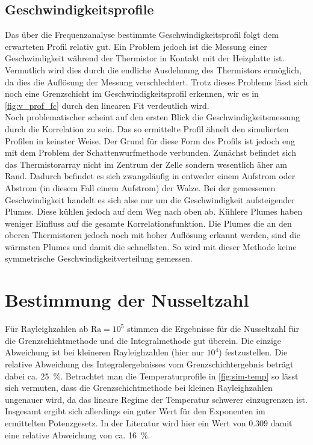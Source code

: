 \subsection{Geschwindigkeitsprofile}
Das über die Frequenzanalyse bestimmte Geschwindigkeitsprofil folgt dem erwarteten Profil relativ gut. Ein Problem jedoch ist die Messung einer Geschwindigkeit während der Thermistor in Kontakt mit der Heizplatte ist. Vermutlich wird dies durch die endliche Ausdehnung des Thermistors ermöglich, da dies die Auflösung der Messung verschlechtert.
Trotz dieses Problems lässt sich noch eine Grenzschicht im Geschwindigkeitsprofil erkennen, wir es in \cref{fig:v_prof_fc} durch den linearen Fit verdeutlich wird.
\\
Noch problematischer scheint auf den ersten Blick die Geschwindigkeitsmessung durch die Korrelation zu sein.
Das so ermittelte Profil ähnelt den simulierten Profilen in keinster Weise. Der Grund für diese Form des Profils ist jedoch eng mit dem Problem der Schattenwurfmethode verbunden.
Zunächst befindet sich das Thermistorarray nicht im Zentrum der Zelle sondern wesentlich äher am Rand. Dadurch befindet es sich zwangsläufig in entweder einem Aufstrom oder Abstrom (in diesem Fall einem Aufstrom) der Walze.
Bei der gemessenen Geschwindigkeit handelt es sich alse nur um die Geschwindigkeit aufsteigender Plumes.
Diese kühlen jedoch auf dem Weg nach oben ab. Kühlere Plumes haben weniger Einfluss auf die gesamte Korrelationsfunktion. Die Plumes die an den oberen Thermistoren jedoch noch mit hoher Auflösung erkannt werden, sind die wärmsten Plumes und damit die schnellsten.
So wird mit dieser Methode keine symmetrische Geschwindigkeitverteilung gemessen.

\section{Bestimmung der Nusseltzahl}
Für Rayleighzahlen ab $\text{Ra} = 10^5$ stimmen die Ergebnisse für die Nusseltzahl für die Grenzschichtmethode und die Integralmethode gut überein. Die einzige Abweichung ist bei kleineren Rayleighzahlen (hier nur $10^4$) festzustellen. Die relative Abweichung des Integralergebnisses vom Grenzschichtergebnis beträgt dabei ca. 25~\%.
Betrachtet man die Temperaturprofile in \cref{fig:sim-temp} so lässt sich vermuten, dass die Grenzschichtmethode bei kleinen Rayleighzahlen ungenauer wird, da das lineare Regime der Temperatur schwerer einzugrenzen ist.
\\
Insgesamt ergibt sich allerdings ein guter Wert für den Exponenten im ermittelten Potenzgesetz. In der Literatur wird hier ein Wert von $0.309$ \cite{expo} damit eine relative Abweichung von ca. 16~\%. 





